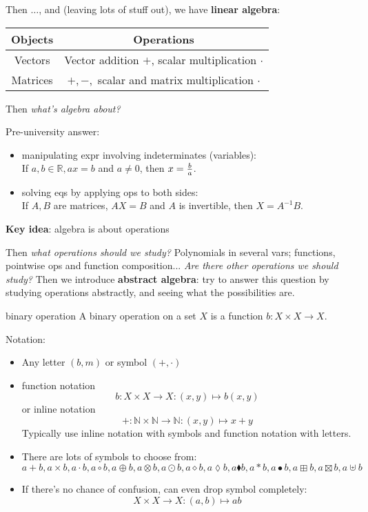 Then $\ldots$, and (leaving lots of stuff out), we have \textbf{linear algebra}:
\begin{center}
\begin{tabular}{c|c}
Objects & Operations \\\hline \hline 
Vectors & Vector addition $+$, scalar multiplication $\cdot$ \\\hline 
Matrices & $+,-,$ scalar and matrix multiplication $\cdot$
\end{tabular}
\end{center}

Then \textit{what's algebra about?}

Pre-university answer:
\begin{itemize}
	\item manipulating expr involving indeterminates (variables):
	\\
	If $a,b\in\mathbb R, ax=b$ and $a\ne 0$, then $x={b\over a}$.
	\item solving eqs by applying ops to both sides:
	\\
	If $A,B$ are matrices, $AX=B$ and $A$ is invertible, then $X=A^{-1}B$.
\end{itemize}
\begin{tcolorbox}
\textbf{Key idea}: algebra is about operations
\end{tcolorbox}

Then \textit{what operations should we study?} Polynomials in several vars; functions, pointwise ops and function composition... \textit{Are there other operations we should study?} Then we introduce \textbf{abstract algebra}: try to answer this question by studying operations abstractly, and seeing what the possibilities are.

\begin{defn}{binary operation}
A binary operation on a set $X$ is a function $b: X\times X\to X$.
\end{defn}

Notation:
\begin{itemize}
	\item Any letter $(b,m)$ or symbol $(+,\cdot)$
	\item function notation
	$$b:X\times X\to X:(x,y)\mapsto b(x,y)$$
	or inline notation
$$+:\mathbb N\times \mathbb N\to \mathbb N:(x,y)\mapsto x+y$$
Typically use inline notation with symbols and function notation with letters.
\item There are lots of symbols to choose from: $a+b,a\times b, a\cdot b, a\circ b, a\oplus b,a\otimes b, a\odot b, a\diamond b, a \lozenge b, a\blacklozenge b, a*b, a\bullet b, a\boxplus b, a\boxtimes b, a\uplus b$
\item If there's no chance of confusion, can even drop symbol completely:
$$X\times X\to X:(a,b)\mapsto ab$$
\end{itemize}

